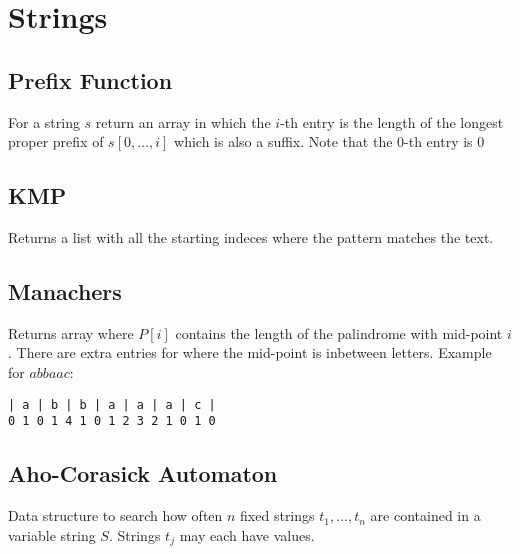 \section{Strings}

\subsection{Prefix Function}
For a string $s$ return an array in which the $i$-th entry is the
length of the longest proper prefix of $s[0,\ldots, i]$ which is also
a suffix.  Note that the $0$-th entry is $0$


\subsection{KMP}
Returns a list with all the starting indeces where the pattern matches
the text.


\subsection{Manachers}
Returns array where $P[i]$ contains the length of the palindrome with
mid-point $i$. There are extra entries for where the mid-point is
inbetween letters. Example for $abbaac$:
\begin{lstlisting}
| a | b | b | a | a | a | c |
0 1 0 1 4 1 0 1 2 3 2 1 0 1 0
\end{lstlisting}

\subsection{Aho-Corasick Automaton}
Data structure to search how often $n$ fixed strings $t_1, \dots, t_n$
are contained in a variable string $S$. Strings $t_j$ may each have
values.


